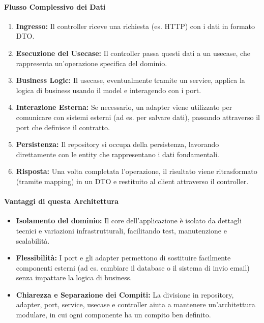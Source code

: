 \paragraph{Flusso Complessivo dei Dati}
\begin{enumerate}
  \item \textbf{Ingresso:} Il controller riceve una richiesta (es. HTTP) con i dati in formato DTO.
  \item \textbf{Esecuzione del Usecase:} Il controller passa questi dati a un usecase, che rappresenta un’operazione specifica del dominio.
  \item \textbf{Business Logic:} Il usecase, eventualmente tramite un service, applica la logica di business usando il model e interagendo con i port.
  \item \textbf{Interazione Esterna:} Se necessario, un adapter viene utilizzato per comunicare con sistemi esterni (ad es. per salvare dati), passando attraverso il port che definisce il contratto.
  \item \textbf{Persistenza:} Il repository si occupa della persistenza, lavorando direttamente con le entity che rappresentano i dati fondamentali.
  \item \textbf{Risposta:} Una volta completata l’operazione, il risultato viene ritrasformato (tramite mapping) in un DTO e restituito al client attraverso il controller.
\end{enumerate}

\paragraph{Vantaggi di questa Architettura}
\begin{itemize}
  \item \textbf{Isolamento del dominio:} Il core dell’applicazione è isolato da dettagli tecnici e variazioni infrastrutturali, facilitando test, manutenzione e scalabilità.
  \item \textbf{Flessibilità:} I port e gli adapter permettono di sostituire facilmente componenti esterni (ad es. cambiare il database o il sistema di invio email) senza impattare la logica di business.
  \item \textbf{Chiarezza e Separazione dei Compiti:} La divisione in repository, adapter, port, service, usecase e controller aiuta a mantenere un’architettura modulare, in cui ogni componente ha un compito ben definito.
\end{itemize}


